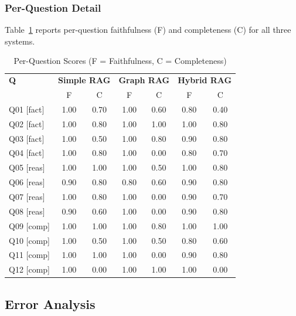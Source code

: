 \documentclass[conference]{IEEEtran}
\begin{document}
\subsubsection{Per-Question Detail}

Table~\ref{tab:results_perq} reports per-question faithfulness (F) and
completeness (C) for all three systems.

\begin{table}[htbp]
  \caption{Per-Question Scores (F = Faithfulness, C = Completeness)}
  \label{tab:results_perq}
  \scriptsize
  \centering
  \renewcommand{\arraystretch}{1.1}
  \begin{tabular}{l|cc|cc|cc}
    \toprule
    \textbf{Q} & \multicolumn{2}{c|}{\textbf{Simple RAG}}
               & \multicolumn{2}{c|}{\textbf{Graph RAG}}
               & \multicolumn{2}{c}{\textbf{Hybrid RAG}} \\
               & F & C & F & C & F & C \\
    \midrule
    Q01 [fact]  & 1.00 & 0.70 & 1.00 & 0.60 & 0.80 & 0.40 \\
    Q02 [fact]  & 1.00 & 0.80 & 1.00 & 1.00 & 1.00 & 0.80 \\
    Q03 [fact]  & 1.00 & 0.50 & 1.00 & 0.80 & 0.90 & 0.80 \\
    Q04 [fact]  & 1.00 & 0.80 & 1.00 & 0.00 & 0.80 & 0.70 \\
    \hline
    Q05 [reas]  & 1.00 & 1.00 & 1.00 & 0.50 & 1.00 & 0.80 \\
    Q06 [reas]  & 0.90 & 0.80 & 0.80 & 0.60 & 0.90 & 0.80 \\
    Q07 [reas]  & 1.00 & 0.80 & 1.00 & 0.00 & 0.90 & 0.70 \\
    Q08 [reas]  & 0.90 & 0.60 & 1.00 & 0.00 & 0.90 & 0.80 \\
    \hline
    Q09 [comp]  & 1.00 & 1.00 & 1.00 & 0.80 & 1.00 & 1.00 \\
    Q10 [comp]  & 1.00 & 0.50 & 1.00 & 0.50 & 0.80 & 0.60 \\
    Q11 [comp]  & 1.00 & 1.00 & 1.00 & 0.00 & 0.90 & 0.80 \\
    Q12 [comp]  & 1.00 & 0.00 & 1.00 & 1.00 & 1.00 & 0.00 \\
    \bottomrule
  \end{tabular}
\end{table}

\subsection{Error Analysis}
\label{sec:error}
\end{document}
